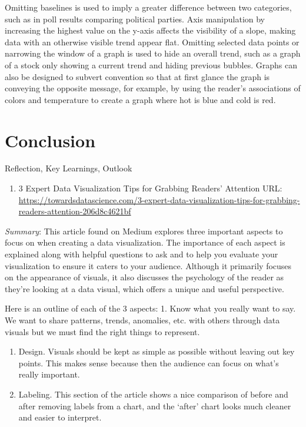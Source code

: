 \documentclass[]{book}
\providecommand{\tightlist}{%
  \setlength{\itemsep}{0pt}\setlength{\parskip}{0pt}}
\theoremstyle{definition}
\theoremstyle{definition}
\theoremstyle{definition}
\theoremstyle{remark}
\begin{document}
Omitting baselines is used to imply a greater difference between two
categories, such as in poll results comparing political parties. Axis
manipulation by increasing the highest value on the y-axis affects the
visibility of a slope, making data with an otherwise visible trend
appear flat. Omitting selected data points or narrowing the window of a
graph is used to hide an overall trend, such as a graph of a stock only
showing a current trend and hiding previous bubbles. Graphs can also be
designed to subvert convention so that at first glance the graph is
conveying the opposite message, for example, by using the reader's
associations of colors and temperature to create a graph where hot is
blue and cold is red.

\chapter{Conclusion}\label{conclusion}

Reflection, Key Learnings, Outlook

\begin{enumerate}
\def\labelenumi{\arabic{enumi}.}
\tightlist
\item
  3 Expert Data Visualization Tips for Grabbing Readers' Attention URL:
  \url{https://towardsdatascience.com/3-expert-data-visualization-tips-for-grabbing-readers-attention-206d8c4621bf}
\end{enumerate}

\emph{Summary}: This article found on Medium explores three important
aspects to focus on when creating a data visualization. The importance
of each aspect is explained along with helpful questions to ask and to
help you evaluate your visualization to ensure it caters to your
audience. Although it primarily focuses on the appearance of visuals, it
also discusses the psychology of the reader as they're looking at a data
visual, which offers a unique and useful perspective.

Here is an outline of each of the 3 aspects: 1. Know what you really
want to say. We want to share patterns, trends, anomalies, etc. with
others through data visuals but we must find the right things to
represent.

\begin{enumerate}
\def\labelenumi{\arabic{enumi}.}
\setcounter{enumi}{1}
\item
  Design. Visuals should be kept as simple as possible without leaving
  out key points. This makes sense because then the audience can focus
  on what's really important.
\item
  Labeling. This section of the article shows a nice comparison of
  before and after removing labels from a chart, and the `after' chart
  looks much cleaner and easier to interpret.
\end{enumerate}
\end{document}
